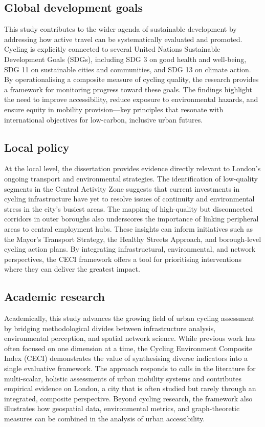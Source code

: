 \documentclass[
  12pt,
  oneside]{book}
\begin{document}
\subsection{Global development goals}\label{global-development-goals}

This study contributes to the wider agenda of sustainable development by addressing how active travel can be systematically evaluated and promoted. Cycling is explicitly connected to several United Nations Sustainable Development Goals (SDGs), including SDG 3 on good health and well-being, SDG 11 on sustainable cities and communities, and SDG 13 on climate action. By operationalising a composite measure of cycling quality, the research provides a framework for monitoring progress toward these goals. The findings highlight the need to improve accessibility, reduce exposure to environmental hazards, and ensure equity in mobility provision---key principles that resonate with international objectives for low-carbon, inclusive urban futures.

\subsection{Local policy}\label{local-policy}

At the local level, the dissertation provides evidence directly relevant to London's ongoing transport and environmental strategies. The identification of low-quality segments in the Central Activity Zone suggests that current investments in cycling infrastructure have yet to resolve issues of continuity and environmental stress in the city's busiest areas. The mapping of high-quality but disconnected corridors in outer boroughs also underscores the importance of linking peripheral areas to central employment hubs. These insights can inform initiatives such as the Mayor's Transport Strategy, the Healthy Streets Approach, and borough-level cycling action plans. By integrating infrastructural, environmental, and network perspectives, the CECI framework offers a tool for prioritising interventions where they can deliver the greatest impact.

\subsection{Academic research}\label{academic-research}

Academically, this study advances the growing field of urban cycling assessment by bridging methodological divides between infrastructure analysis, environmental perception, and spatial network science. While previous work has often focused on one dimension at a time, the Cycling Environment Composite Index (CECI) demonstrates the value of synthesising diverse indicators into a single evaluative framework. The approach responds to calls in the literature for multi-scalar, holistic assessments of urban mobility systems and contributes empirical evidence on London, a city that is often studied but rarely through an integrated, composite perspective. Beyond cycling research, the framework also illustrates how geospatial data, environmental metrics, and graph-theoretic measures can be combined in the analysis of urban accessibility.
\end{document}
